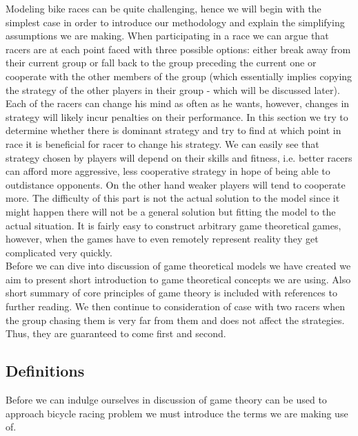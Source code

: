 \documentclass[10pt, a4paper]{report}
\begin{document}
Modeling bike races can be quite challenging, hence we will begin with the simplest case in order to introduce our methodology and explain the simplifying assumptions we are making. When participating in a race we can argue that racers are at each point faced with three possible options: either break away from their current group or fall back to the group preceding the current one or cooperate with the other members of the group (which essentially implies copying the strategy of the other players in their group - which will be discussed later). Each of the racers can change his mind as often as he wants, however, changes in strategy will likely incur penalties on their performance. In this section we try to determine whether there is dominant strategy and try to find at which point in race it is beneficial for racer to change his strategy. We can easily see that strategy chosen by players will depend on their skills and fitness, i.e. better racers can afford more aggressive, less cooperative strategy in hope of being able to outdistance opponents. On the other hand weaker players will tend to cooperate more. The difficulty of this part is not the actual solution to the model since it might happen there will not be a general solution but fitting the model to the actual situation. It is fairly easy to construct arbitrary game theoretical games, however, when the games have to even remotely represent reality they get complicated very quickly.\\

Before we can dive into discussion of game theoretical models we have created we aim to present short introduction to game theoretical concepts we are using. Also short summary of core principles of game theory is included with references to further reading. We then continue to consideration of case with two racers when the group chasing them is very far from them and does not affect the strategies. Thus, they are guaranteed to come first and second.

\subsection{Definitions}\label{subsec:defs}

Before we can indulge ourselves in discussion of game theory can be used to approach bicycle racing problem we must introduce the terms we are making use of.
\end{document}
